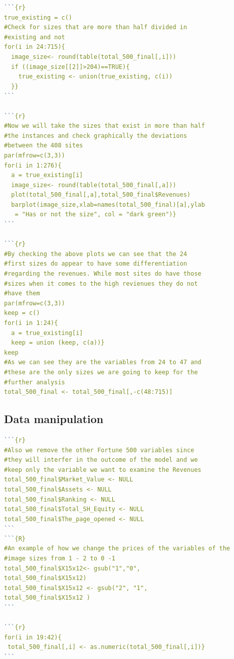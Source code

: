 \documentclass{book}
\begin{document}
\begin{lstlisting}[language=R]
```{r}
true_existing = c()
#Check for sizes that are more than half divided in 
#existing and not
for(i in 24:715){
  image_size<- round(table(total_500_final[,i]))
  if ((image_size[[2]]>204)==TRUE){
    true_existing <- union(true_existing, c(i))
  }}
```

```{r}
#Now we will take the sizes that exist in more than half 
#the instances and check graphically the deviations 
#between the 408 sites
par(mfrow=c(3,3))
for(i in 1:276){
  a = true_existing[i]
  image_size<- round(table(total_500_final[,a]))
  plot(total_500_final[,a],total_500_final$Revenues)
  barplot(image_size,xlab=names(total_500_final)[a],ylab
   = "Has or not the size", col = "dark green")}
```

```{r}
#By checking the above plots we can see that the 24 
#first sizes do appear to have some differentiation 
#regarding the revenues. While most sites do have those 
#sizes when it comes to the high revienues they do not 
#have them
par(mfrow=c(3,3))
keep = c()
for(i in 1:24){
  a = true_existing[i]
  keep = union (keep, c(a))}
keep
#As we can see they are the variables from 24 to 47 and 
#these are the only sizes we are going to keep for the 
#further analysis
total_500_final <- total_500_final[,-c(48:715)]
\end{lstlisting} 

\subsection{Data manipulation}\label{r: van: dm}
\begin{lstlisting}[language=R]
```{r}
#Also we remove the other Fortune 500 variables since 
#they will interfer in the outcome of the model and we 
#keep only the variable we want to examine the Revenues
total_500_final$Market_Value <- NULL
total_500_final$Assets <- NULL
total_500_final$Ranking <- NULL 
total_500_final$Total_SH_Equity <- NULL
total_500_final$The_page_opened <- NULL
```
```{R}
#An example of how we change the prices of the variables of the 
#image sizes from 1 - 2 to 0 -1
total_500_final$X15x12<- gsub("1","0", 
total_500_final$X15x12)
total_500_final$X15x12 <- gsub("2", "1", 
total_500_final$X15x12 )
```

```{r}
for(i in 19:42){
 total_500_final[,i] <- as.numeric(total_500_final[,i])}  
```
\end{lstlisting} 
\end{document}
